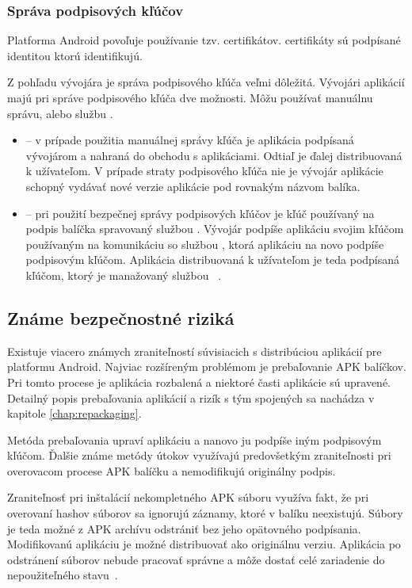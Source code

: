 \subsubsection{\textbf{Správa podpisových kľúčov}}
Platforma Android povoľuje používanie tzv.  certifikátov.  certifikáty sú podpísané identitou ktorú identifikujú. 

Z pohľadu vývojára je správa podpisového kľúča veľmi dôležitá. Vývojári aplikácií majú pri správe podpisového kľúča dve možnosti. Môžu používať manuálnu správu, alebo službu . 
\begin{itemize}
	\item {} -- v prípade použitia manuálnej správy kľúča je aplikácia podpísaná vývojárom a nahraná do obchodu s aplikáciami. Odtiaľ je ďalej distribuovaná k užívateľom. V prípade straty podpisového kľúča nie je vývojár aplikácie schopný vydávať nové verzie aplikácie pod rovnakým názvom balíka.
	\item {} -- pri použití bezpečnej správy podpisových kľúčov  je kľúč používaný na podpis balíčka spravovaný službou  . Vývojár podpíše aplikáciu svojim kľúčom používaným na komunikáciu so službou  , ktorá aplikáciu na novo podpíše podpisovým kľúčom. Aplikácia distribuovaná k užívateľom je teda podpísaná kľúčom, ktorý je manažovaný službou ~\cite{NT0FrzQIkOAYbG2G}. 
\end{itemize}


\subsection{Známe bezpečnostné riziká}

Existuje viacero známych zraniteľností súvisiacich s distribúciou aplikácií  pre platformu Android. Najviac rozšíreným problémom je prebaľovanie APK balíčkov. Pri tomto procese je aplikácia rozbalená a niektoré časti aplikácie sú upravené. Detailný popis prebaľovania aplikácií a rizík s tým spojených sa nachádza v kapitole \ref{chap:repackaging}.

Metóda prebaľovania upraví aplikáciu a nanovo ju podpíše iným podpisovým kľúčom. Ďalšie známe metódy útokov využívajú predovšetkým zraniteľnosti pri overovacom procese APK balíčku a nemodifikujú originálny podpis. 

Zraniteľnosť pri inštalácií nekompletného APK súboru využíva fakt, že pri overovaní hashov súborov sa ignorujú záznamy, ktoré v balíku neexistujú. Súbory je teda možné z APK archívu odstrániť bez jeho opätovného podpísania. Modifikovanú aplikáciu je možné distribuovať ako originálnu verziu. Aplikácia po odstránení súborov nebude pracovať správne a môže dostať celé zariadenie do nepoužiteľného stavu~\cite{A7idcou1z6WqKvQZ}.

